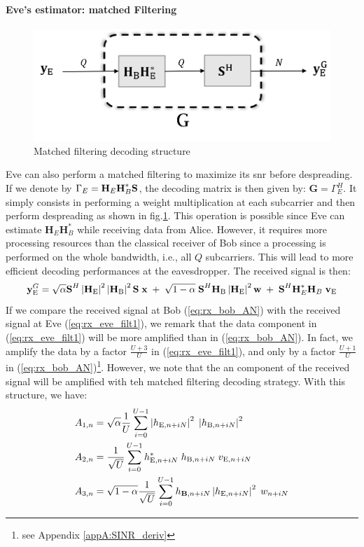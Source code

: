 \paragraph{Eve's estimator: matched Filtering}
\begin{figure}[htb!]
    \centering
    \includegraphics[width=.5\linewidth]{img/matched_filter.png}
    \caption{Matched filtering decoding structure}
    \label{fig:matched_filter}
\end{figure}
Eve can also perform a matched filtering to maximize its \gls{snr} before despreading. If we denote by $\Gamma_E = \textbf{H}_E \textbf{H}_B^* \textbf{S}$, the decoding matrix is then given by: $\textbf{G}=\Gamma_E^H$. It simply consists in performing a weight multiplication at each subcarrier and then perform despreading as shown in fig.\ref{fig:matched_filter}. This operation is possible since Eve can estimate $\textbf{H}_E \textbf{H}_B^*$ while receiving data from Alice. However, it requires more processing resources than the classical receiver of Bob since a processing is performed on the whole bandwidth, i.e., all $Q$ subcarriers. This will lead to more efficient decoding performances at the eavesdropper. The received signal is then:
\begin{equation}
    \textbf{y}_{\text{E}}^G = \sqrt{\alpha} \textbf{S}^H \left|\textbf{H}_{\text{E}}\right|^2 \left|\textbf{H}_{\text{B}}\right|^2 \textbf{S}\; \textbf{x} \; +  \; \sqrt{1-\alpha} \; \textbf{S}^H \textbf{H}_{\text{B}}\left|\textbf{H}_{\text{E}}\right|^2 \textbf{w}  \; +  \; \textbf{S}^H  \textbf{H}^*_E \textbf{H}_B \;\textbf{v}_{\text{E}}
    \label{eq:rx_eve_filt1}
\end{equation}
If we compare the received signal at Bob (\ref{eq:rx_bob_AN}) with the received signal at Eve (\ref{eq:rx_eve_filt1}), we remark that the data component in (\ref{eq:rx_eve_filt1}) will be more amplified than in (\ref{eq:rx_bob_AN}). In fact, we amplify the data by a factor $\frac{U+3}{U}$ in (\ref{eq:rx_eve_filt1}), and only by a factor $\frac{U+1}{U}$ in (\ref{eq:rx_bob_AN})\footnote{see Appendix \ref{appA:SINR_deriv}}. However, we note that the \gls{an} component of the received signal will be amplified with teh matched filtering decoding strategy. With this structure, we have:
\begin{equation}
    \begin{split}
        A_{1,n} &= \sqrt{\alpha}\frac{1}{U}\sum_{i=0}^{U-1}  \left|h_{\text{E}, n + iN}\right|^2 \; \left|h_{\text{B}, n + iN}\right|^2 \\
        A_{2,n} &= \frac{1}{\sqrt{U}}\sum_{i=0}^{U-1} h^*_{\text{E}, n + iN} \; h_{\text{B}, n + iN} \; v_{\text{E}, n + iN}\\
        A_{3,n} &= \sqrt{1-\alpha}\frac{1}{\sqrt{U}}\sum_{i=0}^{U-1}    h_{\text{\textbf{B}}, n + iN} \left|h_{\text{E}, n + iN}\right|^2\; w_{n + iN}
    \end{split}
\end{equation}
